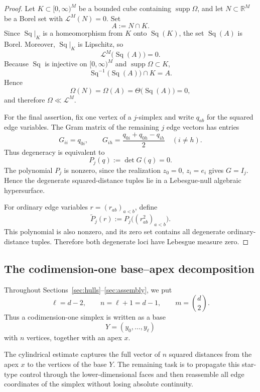 \documentclass[11pt]{article}
\theoremstyle{remark}
\newcommand{\R}{\mathbb R}
\newcommand{\cL}{\mathcal L}
\newcommand{\supp}{\operatorname{supp}}
\numberwithin{equation}{section}
\newcommand{\1}{\mathbf 1}
\begin{document}
\begin{proof}
Let \(K\subset[0,\infty)^M\) be a bounded cube containing
\(\supp\Omega\), and let \(N\subset\R^M\) be a Borel set with
\(\cL^M(N)=0\). Set
\[
A:=N\cap K.
\]
Since \(\operatorname{Sq}|_K\) is a homeomorphism from \(K\) onto
\(\operatorname{Sq}(K)\), the set \(\operatorname{Sq}(A)\) is Borel.
Moreover, \(\operatorname{Sq}|_K\) is Lipschitz, so
\[
\cL^M\bigl(\operatorname{Sq}(A)\bigr)=0.
\]
Because \(\operatorname{Sq}\) is injective on \([0,\infty)^M\) and
\(\supp\Omega\subset K\),
\[
\operatorname{Sq}^{-1}\bigl(\operatorname{Sq}(A)\bigr)\cap K=A.
\]
Hence
\[
\Omega(N)
=
\Omega(A)
=
\Theta\bigl(\operatorname{Sq}(A)\bigr)
=
0,
\]
and therefore \(\Omega\ll\cL^M\).

For the final assertion, fix one vertex of a \(j\)-simplex and write
\(q_{ab}\) for the squared edge variables. The Gram matrix of the
remaining \(j\) edge vectors has entries
\[
G_{ii}=q_{0i},
\qquad
G_{ih}=\frac{q_{0i}+q_{0h}-q_{ih}}{2}
\quad (i\neq h).
\]
Thus degeneracy is equivalent to
\[
P_j(q):=\det G(q)=0.
\]
The polynomial \(P_j\) is nonzero, since the realization
\(z_0=0\), \(z_i=e_i\) gives \(G=I_j\). Hence the degenerate
squared-distance tuples lie in a Lebesgue-null algebraic hypersurface.

For ordinary edge variables \(r=(r_{ab})_{a<b}\), define
\[
\widetilde P_j(r)
:=
P_j\bigl((r_{ab}^2)_{a<b}\bigr).
\]
This polynomial is also nonzero, and its zero set contains all
degenerate ordinary-distance tuples. Therefore both degenerate loci
have Lebesgue measure zero.
\end{proof}









\subsection{The codimension-one base--apex decomposition}

Throughout Sections~\ref{sec:hulls}--\ref{sec:assembly}, we put
\begin{equation}
        \ell=d-2,
        \qquad
        n=\ell+1=d-1,
        \qquad
        m=\binom d2.
\label{eq:ell-n}
\end{equation}
Thus a codimension-one simplex is written as a base
\[
        Y=(y_0,\ldots,y_\ell)
\]
with \(n\) vertices, together with an apex \(x\).

The cylindrical estimate captures the full vector of \(n\) squared
distances from the apex \(x\) to the vertices of the base \(Y\).
The remaining task is to propagate this star-type control through the
lower-dimensional faces and then reassemble all edge coordinates of the
simplex without losing absolute continuity.
\end{document}

